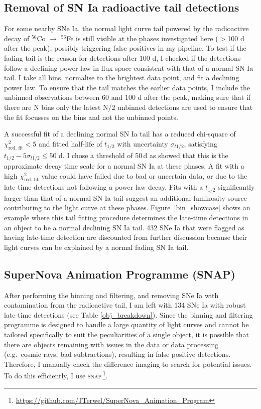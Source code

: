 \documentclass[a4paper,oneside,12pt, class=Latex/Classes/PhDthesisPSnPDF, crop=false]{standalone}
\begin{document}
\subsection{Removal of SN Ia radioactive tail detections}
\label{tail_removal}
For some nearby SNe Ia, the normal light curve tail powered by the radioactive decay of $^{56}$Co $\rightarrow$ $^{56}$Fe is still visible at the phases investigated here ($>$100 d after the peak), possibly triggering false positives in my pipeline. To test if the fading tail is the reason for detections after 100 d, I checked if the detections follow a declining power law in flux space consistent with that of a normal SN Ia tail. I take all bins, normalise to the brightest data point, and fit a declining power law. To ensure that the tail matches the earlier data points, I include the unbinned observations between 60 and 100 d after the peak, making sure that if there are N bins only the latest N/2 unbinned detections are used to ensure that the fit focusses on the bins and not the unbinned points.

A successful fit of a declining normal SN Ia tail has a reduced chi-square of $\chi^2_\text{red, fit} < 5$ and fitted half-life of $t_{1/2}$ with uncertainty $\sigma_{t1/2}$, satisfying $t_{1/2} - 5\sigma_{t1/2} \leq 50$ d. I chose a threshold of 50\,d as \citealt{Georgios_11fe} showed that this is the approximate decay time scale for a normal SN Ia at these phases. A fit with a high $\chi^2_\text{red, fit}$ value could have failed due to bad or uncertain data, or due to the late-time detections not following a power law decay. Fits with a $t_{1/2}$ significantly larger than that of a normal SN Ia tail suggest an additional luminosity source contributing to the light curve at these phases. Figure~\ref{bin_showcase} shows an example where this tail fitting procedure determines the late-time detections in an object to be a normal declining SN Ia tail. 432 SNe Ia that were flagged as having late-time detection are discounted from further discussion because their light curves can be explained by a normal fading SN Ia tail. 


\subsection{SuperNova Animation Programme (SNAP)}
\label{snap}
 After performing the binning and filtering, and removing SNe Ia with contamination from the radioactive tail, I am left with 134 SNe Ia with robust late-time detections (see Table \ref{obj_breakdown}). Since the binning and filtering programme is designed to handle a large quantity of light curves and cannot be tailored specifically to suit the peculiarities of a single object, it is possible that there are objects remaining with issues in the data or data processing (e.g.~cosmic rays, bad subtractions), resulting in false positive detections. Therefore, I manually check the difference imaging to search for potential issues. To do this efficiently, I use \textsc{snap}\,\footnote{\url{https://github.com/JTerwel/SuperNova_Animation_Program}}.
\end{document}
